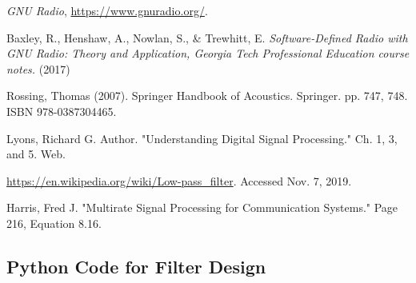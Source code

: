 %
%
%
\begin{thebibliography}{1}

\emph{GNU Radio}, \url{https://www.gnuradio.org/}.

Baxley, R., Henshaw, A., Nowlan, S., \& Trewhitt, E. \emph{Software-Defined Radio with GNU Radio: Theory and Application, Georgia Tech Professional Education course notes.} (2017)

Rossing, Thomas (2007). Springer Handbook of Acoustics. Springer. pp. 747, 748. ISBN 978-0387304465.

Lyons, Richard G. Author. "Understanding Digital Signal Processing."  Ch. 1, 3, and 5. Web.

\url{https://en.wikipedia.org/wiki/Low-pass_filter}.  Accessed Nov. 7, 2019.

Harris, Fred J. "Multirate Signal Processing for Communication Systems." Page 216, Equation 8.16.

\end{thebibliography}


\newpage


\onecolumn
\appendix 

\subsection{Python Code for Filter Design\cite{notes:class}}

